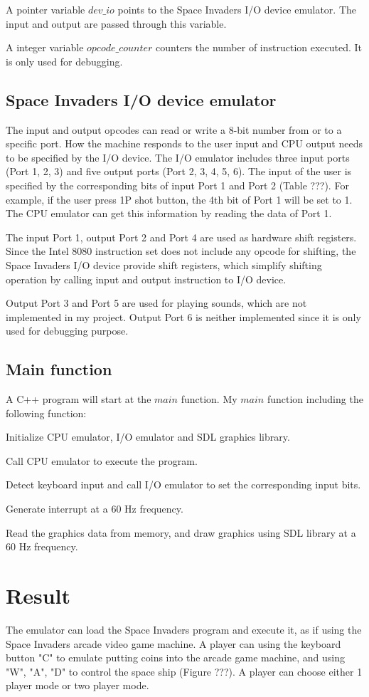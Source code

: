 \documentclass[a4paper,11pt]{article}
\theoremstyle{plain} %
\begin{document}
A pointer variable $dev\_io$ points to the Space Invaders I/O device emulator. The input and output are passed through this variable.

A integer variable $opcode\_counter$ counters the number of instruction executed. It is only used for debugging.

\subsection{Space Invaders I/O device emulator}
The input and output opcodes can read or write a 8-bit number from or to a specific port. How the machine responds to the user input and CPU output needs to be specified by the I/O device. The I/O emulator includes three input ports (Port 1, 2, 3) and five output ports (Port 2, 3, 4, 5, 6). The input of the user is specified by the corresponding bits of input Port 1 and Port 2 (Table ???). For example, if the user press 1P shot button, the 4th bit of Port 1 will be set to 1. The CPU emulator can get this information by reading the data of Port 1.

The input Port 1, output Port 2 and Port 4 are used as hardware shift registers. Since the Intel 8080 instruction set does not include any opcode for shifting, the Space Invaders I/O device provide shift registers, which simplify shifting operation by calling input and output instruction to I/O device.

Output Port 3 and Port 5 are used for playing sounds, which are not implemented in my project. Output Port 6 is neither implemented since it is only used for debugging purpose.

\subsection{Main function}
A C++ program will start at the $main$ function. My $main$ function including the following function:

Initialize CPU emulator, I/O emulator and SDL graphics library. 

Call CPU emulator to execute the program.

Detect keyboard input and call I/O emulator to set the corresponding input bits.

Generate interrupt at a 60 Hz frequency.

Read the graphics data from memory, and draw graphics using SDL library at a 60 Hz frequency.


\section{Result}
The emulator can load the Space Invaders program and execute it, as if using the Space Invaders arcade video game machine. A player can using the keyboard button "C" to emulate putting coins into the arcade game machine, and using "W", "A", "D" to control the space ship (Figure ???). A player can choose either 1 player mode or two player mode.
\end{document}
